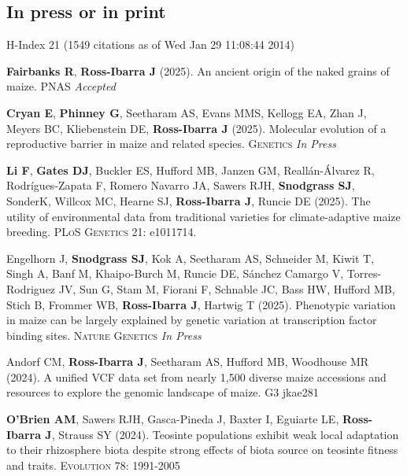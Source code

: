 \documentclass[letterpaper,10pt]{article}
\begin{document}
\subsection*{In press or in print} %
H-Index 21 {\small(1549 citations as of Wed Jan 29 11:08:44 2014)}
\begin{etaremune}
\setlength\itemsep{0ex}

\item \textbf{Fairbanks R}, \textbf{Ross-Ibarra J} (2025). An ancient origin of the naked grains of maize. \textsc{PNAS} \textit{Accepted}%

\item \textbf{Cryan E}, \textbf{Phinney G}, Seetharam AS, Evans MMS, Kellogg EA, Zhan J, Meyers BC,  Kliebenstein DE, \textbf{Ross-Ibarra J} (2025). Molecular evolution of a reproductive barrier in maize and related species. \textsc{Genetics} \textit{In Press} %

\item \textbf{Li F}, \textbf{Gates DJ}, Buckler ES, Hufford MB, Janzen GM, Reall\'an-\'Alvarez R, Rodr\'igues-Zapata F, Romero Navarro JA, Sawers RJH, \textbf{Snodgrass SJ}, SonderK, Willcox MC, Hearne SJ, \textbf{Ross-Ibarra J}, Runcie DE (2025).  The utility of environmental data from traditional varieties for climate-adaptive maize breeding. \textsc{PLoS Genetics} 21: e1011714.

\item Engelhorn J, \textbf{Snodgrass SJ}, Kok A, Seetharam AS, Schneider M, Kiwit T, Singh A, Banf M, Khaipo-Burch M, Runcie DE, Sánchez Camargo V, Torres-Rodriguez JV, Sun G, Stam M, Fiorani F, Schnable JC, Bass HW, Hufford MB, Stich B, Frommer WB, \textbf{Ross-Ibarra J}, Hartwig T (2025). Phenotypic variation in maize can be largely explained by genetic variation at transcription factor binding sites. \textsc{Nature Genetics} \textit{In Press}

\item Andorf CM, \textbf{Ross-Ibarra J}, Seetharam AS, Hufford MB,  Woodhouse MR (2024). A unified VCF data set from nearly 1,500 diverse maize accessions and resources to explore the genomic landscape of maize. \textsc{G3} jkae281

\item \textbf{O'Brien AM},  Sawers RJH, Gasca-Pineda J, Baxter I, Eguiarte LE, \textbf{Ross-Ibarra J}, Strauss SY (2024).  Teosinte populations exhibit weak local adaptation to their rhizosphere biota despite strong effects of biota source on teosinte fitness and traits. \textsc{Evolution} 78: 1991-2005  


\end{etaremune}
\end{document}

